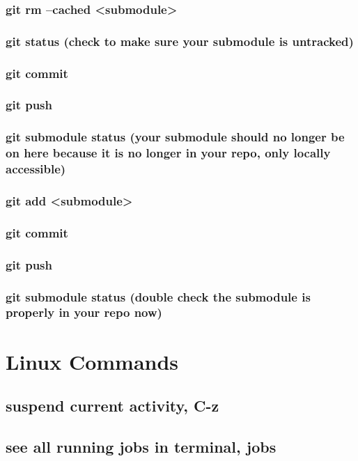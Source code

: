 \documentclass[11pt]{article}
\begin{document}
\subsubsection{git rm --cached <submodule>}
\label{sec:orgf5bd7de}
\subsubsection{git status (check to make sure your submodule is untracked)}
\label{sec:org1b816a7}
\subsubsection{git commit}
\label{sec:org43df9ee}
\subsubsection{git push}
\label{sec:orgfa7aaa4}
\subsubsection{git submodule status (your submodule should no longer be on here because it is no longer in your repo, only locally accessible)}
\label{sec:org824b039}
\subsubsection{git add <submodule>}
\label{sec:orgcea6cbe}
\subsubsection{git commit}
\label{sec:orgf1e8667}
\subsubsection{git push}
\label{sec:orgc2942f0}
\subsubsection{git submodule status (double check the submodule is properly in your repo now)}
\label{sec:orgee97ee5}
\section{Linux Commands}
\label{sec:orga6e5c73}
\subsection{suspend current activity, C-z}
\label{sec:orgd7dce0b}
\subsection{see all running jobs in terminal, jobs}
\label{sec:orgd8c5632}
\end{document}
